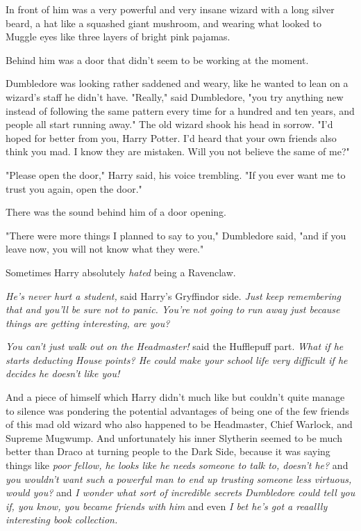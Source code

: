 In front of him was a very powerful and very insane wizard with a long silver
beard, a hat like a squashed giant mushroom, and wearing what looked to Muggle
eyes like three layers of bright pink pajamas.

Behind him was a door that didn't seem to be working at the moment.

Dumbledore was looking rather saddened and weary, like he wanted to lean on a
wizard's staff he didn't have. "Really," said Dumbledore, "you try anything new
instead of following the same pattern every time for a hundred and ten years,
and people all start running away." The old wizard shook his head in sorrow.
"I'd hoped for better from you, Harry Potter. I'd heard that your own friends
also think you mad. I know they are mistaken. Will you not believe the same of
me?"

"Please open the door," Harry said, his voice trembling. "If you ever want me
to trust you again, open the door."

There was the sound behind him of a door opening.

"There were more things I planned to say to you," Dumbledore said, "and if you
leave now, you will not know what they were."

Sometimes Harry absolutely \emph{hated} being a Ravenclaw.

\emph{He's never hurt a student,} said Harry's Gryffindor side. \emph{Just keep
remembering that and you'll be sure not to panic. You're not going to run away
just because things are getting interesting, are you?}

\emph{You can't just walk out on the Headmaster!} said the Hufflepuff part.
\emph{What if he starts deducting House points? He could make your school life
very difficult if he decides he doesn't like you!}

And a piece of himself which Harry didn't much like but couldn't quite manage
to silence was pondering the potential advantages of being one of the few
friends of this mad old wizard who also happened to be Headmaster, Chief
Warlock, and Supreme Mugwump. And unfortunately his inner Slytherin seemed to
be much better than Draco at turning people to the Dark Side, because it was
saying things like \emph{poor fellow, he looks like he needs someone to talk
to, doesn't he?} and \emph{you wouldn't want such a powerful man to end up
trusting someone less virtuous, would you?} and \emph{I wonder what sort of
incredible secrets Dumbledore could tell you if, you know, you became friends
with him} and even \emph{I bet he's got a reaallly interesting book collection.}


